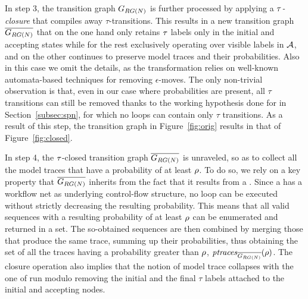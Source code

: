 In step 3, the transition graph $G_{RG(N)}$ is further processed by applying a \emph{$\tau$-closure} that compiles away 
$\tau$-transitions. This results in a new transition graph $\overline{G_{RG(N)}}$ that on the one hand only retains $\tau$ labels only in the initial and accepting states while for the rest exclusively operating over visible labels in $\mathcal{A}$, and on the other continues to preserve model traces and their probabilities. Also in this case we omit the details, as the transformation relies on well-known automata-based techniques for removing $\epsilon$-moves. The only non-trivial observation is that, even in our case where probabilities are present, all $\tau$ transitions can still be removed thanks to the working hypothesis done for  in Section~\ref{subsec:spn}, for which no loops can contain only $\tau$ transitions. As a result of this step, the transition graph in Figure~\eqref{fig:orig} results in that of Figure~\eqref{fig:closed}.


In step 4, the $\tau$-closed transition graph $\overline{G_{RG(N)}}$ is unraveled, so as to collect all the model traces that have a probability of at least $\rho$. To do so, we rely on a key property that $\overline{G_{RG(N)}}$ inherits from the fact that it results from a \uswn. Since a \uswn has a workflow net as underlying control-flow structure, no loop can be executed without strictly decreasing the resulting probability. This means that all valid sequences with a resulting probability of at least $\rho$ can be enumerated and returned in a set. The so-obtained sequences are then combined by merging those that produce the same trace, summing up their probabilities, thus obtaining the set of all the traces having a probability greater than $\rho$, $\mathit{ptraces}_{\overline{G_{RG(N)}}}(\rho)$. The closure operation also implies that the notion of model trace collapses with the one of run modulo removing the initial and the final $\tau$ labels attached to the initial and accepting nodes.


